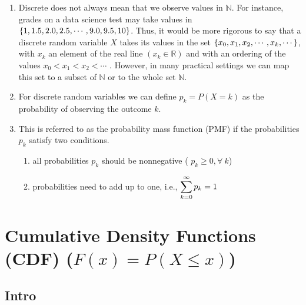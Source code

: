 \begin{enumerate}
    \item Discrete does not always mean that we observe values in $\mathbb{N}$. 
    For instance, grades on a data science test may take values in $\left\{1, 1.5, 2.0, 2.5, \cdots , 9.0, 9.5, 10\right\}$. 
    Thus, it would be more rigorous to say that a discrete random variable $X$ takes its values in the set $\left\{x_0, x_1, x_2, \cdots , x _k , \cdots\right\}$, with $x _k$ an element of the real line $(x _k \in \mathbb{R})$ and with an ordering of the values $x_0 < x_1 < x_2 < \cdots$ . 
    However, in many practical settings we can map this set to a subset of $\mathbb{N}$ or to the whole set $\mathbb{N}$.
    \hfill \cite{statistics/book/Statistics-for-Data-Scientists/Maurits-Kaptein}

    \item For discrete random variables we can define $p _k = P(X = k)$ as the probability of observing the outcome $k$.
    \hfill \cite{statistics/book/Statistics-for-Data-Scientists/Maurits-Kaptein}

    \item This is referred to as the probability mass function (PMF) if the probabilities $p _k$ satisfy two conditions. 
    \hfill \cite{statistics/book/Statistics-for-Data-Scientists/Maurits-Kaptein}
    \begin{enumerate}
        \item all probabilities $p _k$ should be nonnegative ( $p _k \geq 0, \forall\ k$)
        \hfill \cite{statistics/book/Statistics-for-Data-Scientists/Maurits-Kaptein}

        \item probabilities need to add up to one, i.e., $\displaystyle\sum^{\infty}_{k=0} p _k = 1$
        \hfill \cite{statistics/book/Statistics-for-Data-Scientists/Maurits-Kaptein}
    \end{enumerate}
\end{enumerate}







\section{Cumulative Density Functions (CDF) ($F(x) = P(X \leq x)$)}

\subsection{Intro}

